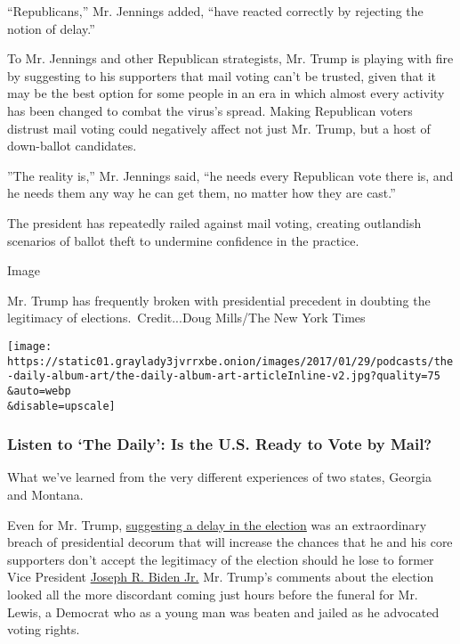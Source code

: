``Republicans,'' Mr. Jennings added, ``have reacted correctly by
rejecting the notion of delay.''

To Mr. Jennings and other Republican strategists, Mr. Trump is playing
with fire by suggesting to his supporters that mail voting can't be
trusted, given that it may be the best option for some people in an era
in which almost every activity has been changed to combat the virus's
spread. Making Republican voters distrust mail voting could negatively
affect not just Mr. Trump, but a host of down-ballot candidates.

''The reality is,'' Mr. Jennings said, ``he needs every Republican vote
there is, and he needs them any way he can get them, no matter how they
are cast.''

The president has repeatedly railed against mail voting, creating
outlandish scenarios of ballot theft to undermine confidence in the
practice.

Image

Mr. Trump has frequently broken with presidential precedent in doubting
the legitimacy of elections.~Credit...Doug Mills/The New York Times

\texttt{[image: https://static01.graylady3jvrrxbe.onion/images/2017/01/29/podcasts/the-daily-album-art/the-daily-album-art-articleInline-v2.jpg?quality=75\\\&auto=webp\\\&disable=upscale]}

\hypertarget{listen-to-the-daily-is-the-us-ready-to-vote-by-mail}{%
\subsubsection{Listen to `The Daily': Is the U.S. Ready to Vote by
Mail?}\label{listen-to-the-daily-is-the-us-ready-to-vote-by-mail}}

What we've learned from the very different experiences of two states,
Georgia and Montana.

Even for Mr. Trump,
\href{https://twitter.com/realDonaldTrump/status/1288818160389558273?s=20}{suggesting
a delay in the election} was an extraordinary breach of presidential
decorum that will increase the chances that he and his core supporters
don't accept the legitimacy of the election should he lose to former
Vice President
\href{https://www.nytimes3xbfgragh.onion/interactive/2020/us/elections/joe-biden.html}{Joseph
R. Biden Jr.} Mr. Trump's comments about the election looked all the
more discordant coming just hours before the funeral for Mr. Lewis, a
Democrat who as a young man was beaten and jailed as he advocated voting
rights.

